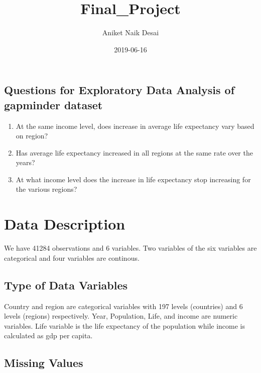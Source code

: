 \documentclass[]{article}
\title{Final\_Project}
\author{Aniket Naik Desai}
\date{2019-06-16}
\providecommand{\tightlist}{%
  \setlength{\itemsep}{0pt}\setlength{\parskip}{0pt}}
\begin{document}
\maketitle

\hypertarget{questions-for-exploratory-data-analysis-of-gapminder-dataset}{%
\subsection{Questions for Exploratory Data Analysis of gapminder
dataset}\label{questions-for-exploratory-data-analysis-of-gapminder-dataset}}

\begin{enumerate}
\def\labelenumi{\arabic{enumi}.}
\tightlist
\item
  At the same income level, does increase in average life expectancy
  vary based on region?
\item
  Has average life expectancy increased in all regions at the same rate
  over the years?
\item
  At what income level does the increase in life expectancy stop
  increasing for the various regions?
\end{enumerate}

\hypertarget{data-description}{%
\section{Data Description}\label{data-description}}

We have 41284 observations and 6 variables. Two variables of the six
variables are categorical and four variables are continous.

\hypertarget{type-of-data-variables}{%
\subsection{Type of Data Variables}\label{type-of-data-variables}}

Country and region are categorical variables with 197 levels (countries)
and 6 levels (regions) respectively. Year, Population, Life, and income
are numeric variables. Life variable is the life expectancy of the
population while income is calculated as gdp per capita.

\hypertarget{missing-values}{%
\subsection{Missing Values}\label{missing-values}}
\end{document}
